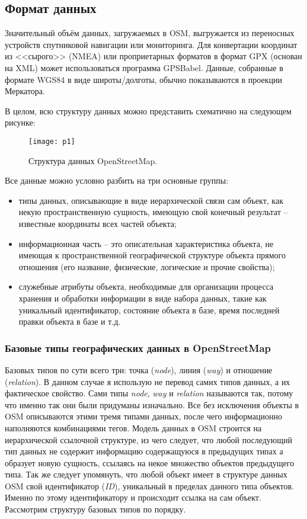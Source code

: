 \subsection{Формат данных}
Значительный объём данных, загружаемых в OSM, выгружается из переносных 
устройств спутниковой навигации или мониторинга. Для конвертации координат 
из <<сырого>> (NMEA) или проприетарных форматов в формат GPX (основан на XML) 
может использоваться программа GPSBabel. Данные, собранные в формате WGS84 в 
виде широты/долготы, обычно показываются в проекции Меркатора\cite{projection}.

В целом, всю структуру данных можно представить схематично на следующем рисунке:
\begin{figure}[ht!]
    \center
    \texttt{[image: p1]}
    \caption{Структура данных OpenStreetMap.}
\end{figure}

Все данные можно условно разбить на три основные группы:
\begin{itemize}
    \item типы данных, описывающие в виде иерархической связи сам объект, как 
        некую пространственную сущность, имеющую свой конечный результат -- 
        известные координаты всех частей объекта;
    \item информационная часть -- это описательная характеристика объекта, не 
        имеющая к пространственной географической структуре объекта прямого 
        отношения (его название, физические, логические и прочие свойства);
    \item служебные атрибуты объекта, необходимые для организации процесса 
        хранения и обработки информации в виде набора данных, такие как 
        уникальный идентификатор, состояние объекта в базе, время последней 
        правки объекта в базе и т.д.
\end{itemize}

\subsubsection{Базовые типы географических данных в OpenStreetMap}
\label{part01}
Базовых типов по сути всего три: точка (\emph{node}), линия (\emph{way}) и 
отношение (\emph{relation}). В данном случае я использую не перевод самих 
типов данных, а их фактическое свойство. Сами типы \emph{node}, \emph{way} и 
\emph{relation} называются так, потому что именно так они были придуманы 
изначально. Все без исключения объекты в OSM описываются этими тремя типами 
данных, после чего информационно наполняются комбинациями тегов. Модель данных 
в OSM строится на иерархической ссылочной структуре, из чего следует, что 
любой последующий тип данных не содержит информацию содержащуюся в предыдущих 
типах а образует новую сущность, ссылаясь на некое множество объектов 
предыдущего типа. Так же следует упомянуть, что любой объект имеет в структуре 
данных OSM свой идентификатор (\emph{ID}), уникальный в пределах данного типа 
объектов. Именно по этому идентификатору и происходит ссылка на сам объект. 
Рассмотрим структуру базовых типов по порядку.

